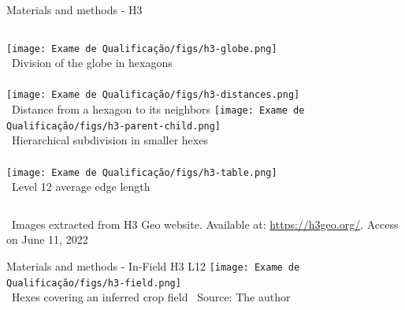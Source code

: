 \documentclass[xcolor=table]{beamer}
\begin{document}
\begin{frame}{Materials and methods - H3}
    \begin{columns}[t]
            \centering
            \texttt{[image: Exame de Qualificação/figs/h3-globe.png]}
            \\\tiny~Division of the globe in hexagons
            \\~\\
            \texttt{[image: Exame de Qualificação/figs/h3-distances.png]}
            \\\tiny~Distance from a hexagon to its neighbors
            \centering
            \texttt{[image: Exame de Qualificação/figs/h3-parent-child.png]}
            \\\tiny~Hierarchical subdivision in smaller hexes
            \\~\\
            \texttt{[image: Exame de Qualificação/figs/h3-table.png]}
            \\\tiny~Level 12 average edge length
    \end{columns}
    ~\flushright \tiny {Images extracted from H3 Geo website. Available at: \url{https://h3geo.org/}. Access on June 11, 2022}
\end{frame}

\begin{frame}{Materials and methods - In-Field H3 L12}
    \centering
    \texttt{[image: Exame de Qualificação/figs/h3-field.png]}
    \\\tiny~Hexes covering an inferred crop field
    ~\flushright \tiny {Source: The author}
\end{frame}
\end{document}
